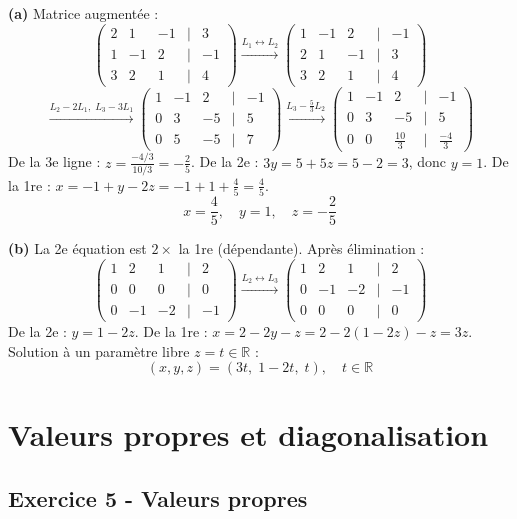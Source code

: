 \documentclass[12pt,a4paper]{article}
\begin{document}
\begin{boitecorrige}
\textbf{(a)} Matrice augmentée :
\[
\begin{pmatrix}2&1&-1&\mid&3\\1&-1&2&\mid&-1\\3&2&1&\mid&4\end{pmatrix}
\xrightarrow{L_1\leftrightarrow L_2}
\begin{pmatrix}1&-1&2&\mid&-1\\2&1&-1&\mid&3\\3&2&1&\mid&4\end{pmatrix}
\]
\[
\xrightarrow{L_2-2L_1,\;L_3-3L_1}
\begin{pmatrix}1&-1&2&\mid&-1\\0&3&-5&\mid&5\\0&5&-5&\mid&7\end{pmatrix}
\xrightarrow{L_3-\frac{5}{3}L_2}
\begin{pmatrix}1&-1&2&\mid&-1\\0&3&-5&\mid&5\\0&0&\frac{10}{3}&\mid&\frac{-4}{3}\end{pmatrix}
\]
De la 3e ligne : $z = \frac{-4/3}{10/3} = -\frac{2}{5}$. De la 2e : $3y = 5+5z = 5-2 = 3$, donc $y=1$. De la 1re : $x = -1+y-2z = -1+1+\frac{4}{5} = \frac{4}{5}$.
\[
\boxed{x = \frac{4}{5},\quad y = 1,\quad z = -\frac{2}{5}}
\]

\textbf{(b)} La 2e équation est $2\times$ la 1re (dépendante). Après élimination :
\[
\begin{pmatrix}1&2&1&\mid&2\\0&0&0&\mid&0\\0&-1&-2&\mid&-1\end{pmatrix}
\xrightarrow{L_2\leftrightarrow L_3}
\begin{pmatrix}1&2&1&\mid&2\\0&-1&-2&\mid&-1\\0&0&0&\mid&0\end{pmatrix}
\]
De la 2e : $y = 1-2z$. De la 1re : $x = 2-2y-z = 2-2(1-2z)-z = 3z$. Solution à un paramètre libre $z=t\in\mathbb{R}$ :
\[
\boxed{(x,y,z) = (3t,\;1-2t,\;t), \quad t\in\mathbb{R}}
\]
\end{boitecorrige}

\section{Valeurs propres et diagonalisation}

\subsection*{Exercice 5 - Valeurs propres \niveau{\moyen}}
\end{document}
